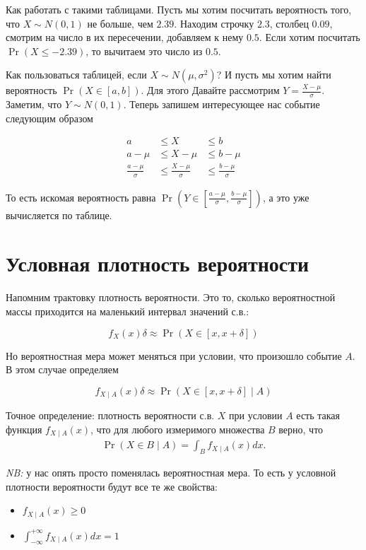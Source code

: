 \documentclass[12pt]{article}
\begin{document}
Как работать с такими таблицами. Пусть мы хотим посчитать вероятность того, что $X \sim N(0, 1)$ не больше, чем $2.39$. Находим строчку $2.3$, столбец $0.09$, смотрим на число в их пересечении, добавляем к нему $0.5$. Если хотим посчитать $\Pr(X \le -2.39)$, то вычитаем это число из $0.5$. 

Как пользоваться таблицей, если $X \sim N(\mu, \sigma^2)$? И пусть мы хотим найти вероятность $\Pr(X \in [a, b])$.
Для этого Давайте рассмотрим $Y = \frac{X - \mu}{\sigma}$. Заметим, что $Y \sim N(0, 1)$. Теперь запишем интересующее нас событие следующим образом

\begin{align*}
  a &\le X &\le b \\
  a - \mu &\le X - \mu &\le b - \mu  \\
  \frac{a - \mu}{\sigma} & \le \frac{X - \mu}{\sigma} &\le \frac{b - \mu}{\sigma} 
\end{align*}

То есть искомая вероятность равна $\Pr(Y \in [\frac{a - \mu}{\sigma}, \frac{b - \mu}{\sigma}])$, а это уже вычисляется по таблице.


\section{Условная плотность вероятности}

Напомним трактовку плотность вероятности. Это то, сколько вероятностной массы приходится на маленький интервал значений с.в.:

\[f_X(x) \delta \approx \Pr(X \in [x, x + \delta])\]

Но вероятностная мера может меняться при условии, что произошло событие $A$. В этом случае определяем

\[f_{X\mid A} (x) \delta \approx \Pr(X \in [x, x + \delta] \mid A)\]

Точное определение: плотность вероятности с.в. $X$ при условии $A$ есть такая функция $f_{X \mid A}(x)$, что для любого измеримого множества $B$ верно, что
\begin{align*}
  \Pr(X \in B \mid A) = \int_B f_{X \mid A}(x) dx.
\end{align*}

\emph{NB:} у нас опять просто поменялась вероятностная мера. То есть у условной плотности вероятности будут все те же свойства:
\begin{itemize}
  \item $f_{X \mid A}(x) \ge 0$
  \item $\int_{-\infty}^{+\infty} f_{X \mid A} (x) dx = 1$
 \end{itemize}
\end{document}
